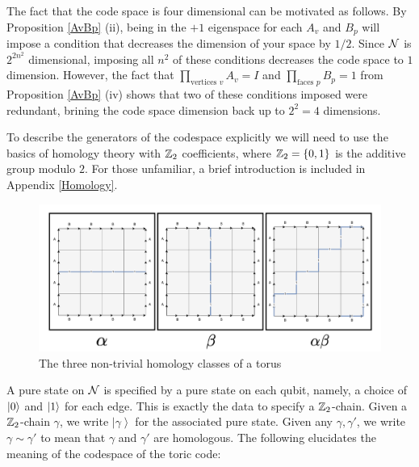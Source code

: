 \documentclass{article}
\theoremstyle{definition}
\numberwithin{figure}{section}
\begin{document}
The fact that the code space is four dimensional can be motivated as follows. By Proposition \ref{AvBp} (ii), being in the $+1$ eigenspace for each $A_v$ and $B_p$ will impose a condition that decreases the dimension of your space by $1/2$. Since $\mathcal{N}$ is $2^{2n^2}$ dimensional, imposing all $n^2$ of these conditions decreases the code space to $1$ dimension. However, the fact that $\prod_{\text{vertices }v}A_v=I$ and $\prod_{\text{faces }p}B_p=1$  from Proposition \ref{AvBp} (iv) shows that two of these conditions imposed were redundant, brining the code space dimension back up to $2^2=4$ dimensions.

To describe the generators of the codespace explicitly we will need to use the basics of homology theory with $\mathbb{Z}_2$ coefficients, where $\mathbb{Z}_2=\{0,1\}$ is the additive group modulo $2$. For those unfamiliar, a brief introduction is included in Appendix \ref{Homology}.

\begin{figure}
\begin{center}
\includegraphics[scale=0.35]{homology-classes}
\caption{The three non-trivial homology classes of a torus}
\label{fig:homology}
\end{center}
\end{figure}


A pure state on $\mathcal{N}$ is specified by a pure state on each qubit, namely, a choice of $\left|0\right>$ and $\left|1\right>$ for each edge. This is exactly the data to specify a $\mathbb{Z}_2$-chain. Given a $\mathbb{Z}_2$-chain $\gamma$, we write $\left|\gamma\right>$ for the associated pure state. Given any $\gamma,\gamma'$, we write $\gamma\sim \gamma'$ to mean that $\gamma$ and $\gamma'$ are homologous. The following elucidates the meaning of the codespace of the toric code:
\end{document}
